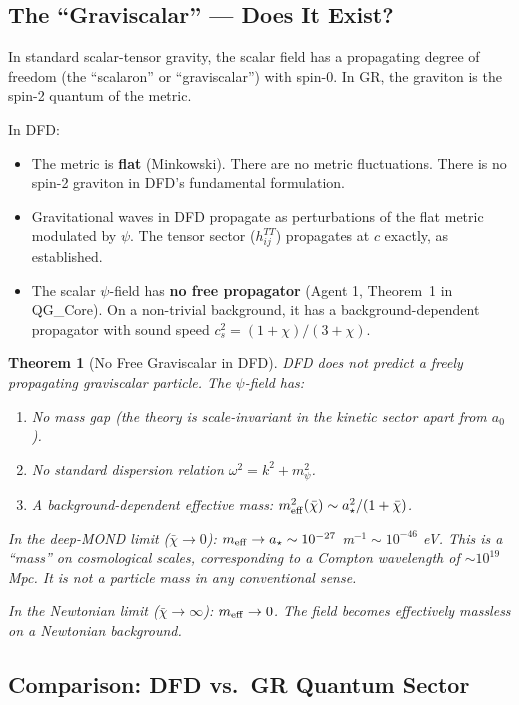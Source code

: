 \documentclass[11pt,a4paper]{article}
\newtheorem{theorem}{Theorem}
\begin{document}
\subsection{The ``Graviscalar'' --- Does It Exist?}
\label{sec:graviscalar}

In standard scalar-tensor gravity, the scalar field has a propagating degree of freedom (the ``scalaron'' or ``graviscalar'') with spin-0. In GR, the graviton is the spin-2 quantum of the metric.

In DFD:
\begin{itemize}
\item The metric is \textbf{flat} (Minkowski). There are no metric fluctuations. There is no spin-2 graviton in DFD's fundamental formulation.
\item Gravitational waves in DFD propagate as perturbations of the flat metric modulated by $\psi$. The tensor sector ($h_{ij}^{TT}$) propagates at $c$ exactly, as established.
\item The scalar $\psi$-field has \textbf{no free propagator} (Agent 1, Theorem~1 in QG\_Core). On a non-trivial background, it has a background-dependent propagator with sound speed $c_s^2 = (1+\chi)/(3+\chi)$.
\end{itemize}

\begin{theorem}[No Free Graviscalar in DFD]
\label{thm:no-graviscalar}
DFD does not predict a freely propagating graviscalar particle. The $\psi$-field has:
\begin{enumerate}
\item No mass gap (the theory is scale-invariant in the kinetic sector apart from $a_0$).
\item No standard dispersion relation $\omega^2 = k^2 + m_\psi^2$.
\item A background-dependent effective mass: $m_{\rm eff}^2(\bar\chi) \sim a_\star^2/(1+\bar\chi)$.
\end{enumerate}

In the deep-MOND limit ($\bar\chi \to 0$): $m_{\rm eff} \to a_\star \sim 10^{-27}$ m$^{-1} \sim 10^{-46}$ eV. This is a ``mass'' on cosmological scales, corresponding to a Compton wavelength of $\sim 10^{19}$ Mpc. It is not a particle mass in any conventional sense.

In the Newtonian limit ($\bar\chi \to \infty$): $m_{\rm eff} \to 0$. The field becomes effectively massless on a Newtonian background.
\end{theorem}

\subsection{Comparison: DFD vs.\ GR Quantum Sector}
\end{document}
